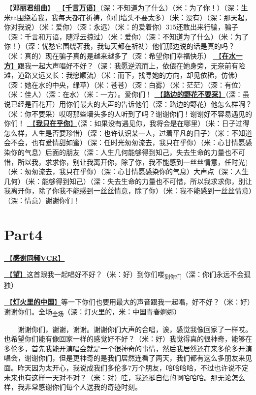 \documentclass[]{ctexbook}
\begin{document}
🎵【\textbf{邓丽君组曲}】
\hyperref[thousands-of-words]{🎵【\textbf{千言万语}】}（深：不知道为了什么）（米：为了你！）（深：生米ta围绕着我，我每天都在祈祷，你们墙头不要太多）（米：没有）（深：那天起，你对我说）（米：爱你）（深：永远）（米：的爱着你）315还敢出来行骗，骗子（深：千言和万语，随浮云掠过）（米：爱你）（深：不知道为了什么）（米：为了你！）（深：忧愁它围绕著我，我每天都在祈祷）他们那边说的话是真的吗？（米：真的）现在骗子真的是越来越多了（深：希望你们幸福快乐）
\hyperref[on-the-water-side]{🎵【\textbf{在水一方}】}跟我一起大声唱好不好？（深：我愿逆流而上，依偎在她身旁，无奈前有险滩，道路又远又长：我愿顺流）（米：而下，找寻她的方向，却见依稀，仿佛）（深：她在水的中央，绿草）（米：苍苍）（深：白雾）（米：茫茫）（深：有位）（米：佳人）（深：在水）（米：一方）。爱你们！
\hyperref[only-with-me]{🎵【\textbf{路边的野花不要采}】}（深：虽说已经是百花开）用你们最大的大声的告诉他们（深：路边的野花）他怎么样啊？（米：你不要采）哎呀那些墙头多的人听到了吗？谢谢你们！谢谢好不容易遇见的你们！
\hyperref[only-you]{🎵【\textbf{我只在乎你}】}（深：如果没有遇见你，我将会是在哪里）（米：日子过得怎么样，人生是否要珍惜）（深：也许认识某一人，过着平凡的日子）（米：不知道会不会，也有爱情甜如蜜）（深：任时光匆匆流去，我只在乎你）（米：心甘情愿感染你的气息）后面的朋友（深：人生几何能够得到知己，失去生命的力量也不可惜，所以我，求求你，别让我离开你，除了你，我不能感到一丝丝情意，任时光)（米：匆匆流去，我只在乎你）（深：心甘情愿感染你的气息）大声点（深：人生几何）（米：能够得到知己）（深：失去生命的力量也不可惜，所以我求求你，别让我离开你，除了你我不能感到一丝丝情意，除了你）（米：我不能感到一丝丝情意）（深：情意）谢谢你们！

\section{Part4}\label{Toronto-20250315-part4}

\hyperref[thank-you-vcr]{🎥【\textbf{感谢同频VCR}】}

\hyperref[Gaze]{🎵【\textbf{望}】}这首跟我一起唱好不好？（米：好）到你们喽\textsubscript{到你们}（深：你们永远不会孤独）

\hyperref[China-in-the-lights]{🎵【\textbf{灯火里的中国}】}等一下你们也要用最大的声音跟我一起唱，好不好？（米：好）谢谢你们。全场\textsubscript{全场}（深：灯火里的，米：中国青春婀娜）

  谢谢你们，谢谢，谢谢。谢谢你们大声的合唱，诶，感觉我像回家了一样哎。也希望你们能有像回家一样的感觉好不好？（米：好）我觉得真的很神奇，能够在多伦多，首先我能开演唱会就是一个很神奇的事情，然后我居然还在来多伦多开演唱会，谢谢你们，但是更神奇的是我们居然连看了两天，我们都有这么多朋友来见面。昨天因为太开心，我说成我们多伦多7万个朋友，哈哈哈哈，不过也许说不定未来也有这样一天对不对？（米：对）哇，我还挺自信的啊哈哈哈。那无论怎么样，我非常感谢你们每个人送我的奇迹时刻。
\end{document}
